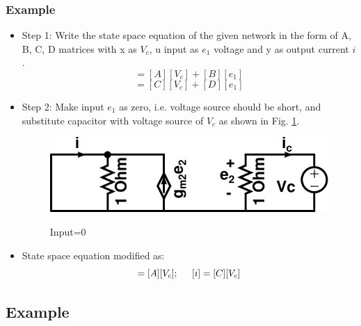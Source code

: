 \documentclass{beamer}
\begin{document}
\begin{frame}
\frametitle{Example}

\begin{small}
        \begin{itemize}
	\item Step 1: Write the state space equation of the given network in the form of A, B, C, D matrices with x as $V_c$, u input as $ e_1$ voltage and y as output current $ i$.
\begin{equation}
 [\dot{V}_c]=[A][V_c]+[B][e_1]
\end{equation}
\begin{equation}
 [i]=[C][V_c]+[D][e_{1}]
\end{equation}
\item Step 2: Make input $e_1$ as zero, i.e. voltage source should be short, and substitute capacitor with voltage source of $V_c$ as shown in Fig. \ref{ex2}.


\begin{figure}[h!]
\centering
{\label{method}\includegraphics[totalheight=.2\textheight,width=.6\textwidth]{images/ex3b}}
\caption{Input=0}
\label{ex2}
\end{figure}


\item State space equation modified as:\\
\begin{equation}
 [\dot{V}_c]=[A][V_c]; \hspace{.2in}[i]=[C][V_c]
\end{equation}
         \end{itemize}
\end{small}


\end{frame}




\subsection*{Example}
\end{document}
